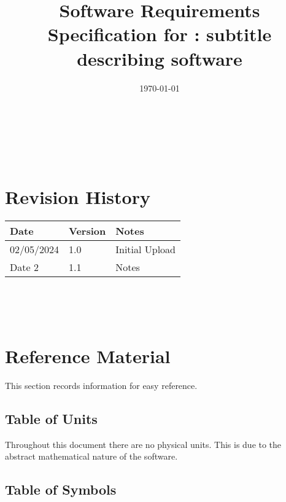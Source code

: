 \documentclass[12pt]{article}
\begin{document}
\title{Software Requirements Specification for \progname: subtitle describing software} 
\author{\authname}
\date{\today}
	
\maketitle

~\newpage


\tableofcontents

~\newpage

\section*{Revision History}

\begin{tabularx}{\textwidth}{p{3cm}p{2cm}X}
\toprule {\bf Date} & {\bf Version} & {\bf Notes}\\
\midrule
02/05/2024 & 1.0 & Initial Upload\\
Date 2 & 1.1 & Notes\\
\bottomrule
\end{tabularx}

~\\

~\newpage

\section{Reference Material}

This section records information for easy reference.

\subsection{Table of Units}

Throughout this document there are no physical units. This is due to the abstract mathematical nature of the software. 

\subsection{Table of Symbols}
\end{document}

